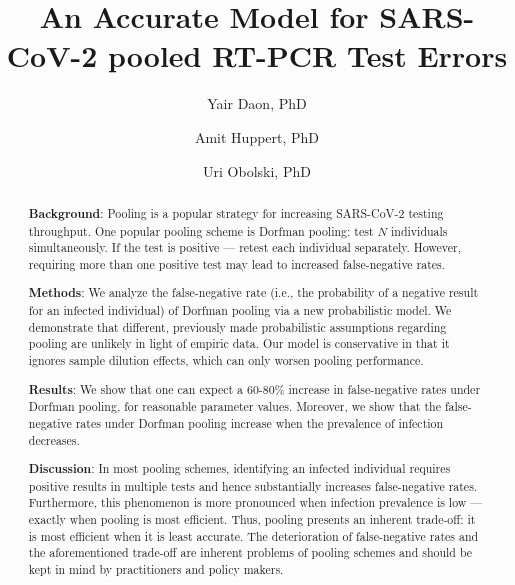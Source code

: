 \documentclass{article}
\begin{document}
\title{An Accurate Model for SARS-CoV-2 pooled RT-PCR Test Errors}

\author[1,2]{Yair Daon, PhD}
\author[2,3]{Amit Huppert, PhD}
\author[1,2]{Uri Obolski, PhD}



\date{}

\maketitle

\begin{abstract}
\textbf{Background}: Pooling is a popular strategy for increasing
SARS-CoV-2 testing throughput. One popular pooling scheme is Dorfman
pooling: test $N$ individuals simultaneously. If the test is positive
--- retest each individual separately. However, requiring more than
one positive test may lead to increased false-negative rates.

\textbf{Methods}: We analyze the false-negative rate (i.e., the
probability of a negative result for an infected individual) of
Dorfman pooling via a new probabilistic model. We demonstrate that
different, previously made probabilistic assumptions regarding pooling
are unlikely in light of empiric data. Our model is conservative in
that it ignores sample dilution effects, which can only worsen pooling
performance.

\textbf{Results}: We show that one can expect a 60-80\% increase in
false-negative rates under Dorfman pooling, for reasonable parameter
values. Moreover, we show that the false-negative rates under Dorfman
pooling increase when the prevalence of infection decreases.

\textbf{Discussion}: In most pooling schemes, identifying an infected
individual requires positive results in multiple tests and hence
substantially increases false-negative rates. Furthermore, this
phenomenon is more pronounced when infection prevalence is low ---
exactly when pooling is most efficient. Thus, pooling presents an
inherent trade-off: it is most efficient when it is least
accurate. The deterioration of false-negative rates and the
aforementioned trade-off are inherent problems of pooling schemes and
should be kept in mind by practitioners and policy makers.
\end{abstract}
\newpage
\end{document}
